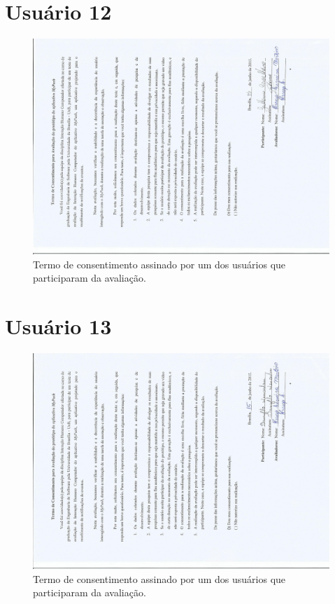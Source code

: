 \begin{anexosenv}
	
	 \section*{Usuário 12}
    \begin{figure}[!htbp]
      \centering
      \includegraphics[scale=0.6, angle=-90]{editaveis/figuras/cavalheiro}
      \caption{Termo de consentimento assinado por um dos usuários que participaram da avaliação.}
      \label{termo_consentimento_1}
    \end{figure}
    \pagebreak
	
	
	 \section*{Usuário 13}
    \begin{figure}[!htbp]
      \centering
      \includegraphics[scale=0.6, angle=-90]{editaveis/figuras/danilo}
      \caption{Termo de consentimento assinado por um dos usuários que participaram da avaliação.}
      \label{termo_consentimento_1}
    \end{figure}
    \pagebreak
	

\end{anexosenv}
